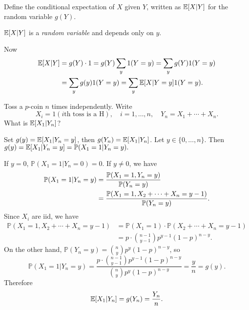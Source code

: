 \begin{definition}
    Define the conditional expectation of $X$ given $Y$, written as $ {\mathbb{E}}[X|Y] $ for the random variable $g(Y)$.
\end{definition}
\begin{remark}
    $ {\mathbb{E}}[X|Y] $ is a \textit{random variable} and depends only on $y$.
\end{remark}
Now 
\begin{align*}
    {\mathbb{E}}[X|Y] &= g(Y)\cdot 1 = g(Y) \sum_{y} 1(Y=y) = \sum_{y} g(Y)1(Y=y)\\ 
    &= \sum_{y} g(y)1(Y=y)=\sum_{y} {\mathbb{E}}[X|Y=y]1(Y=y).
\end{align*}
\begin{example}\label{eg:2.11}
    Toss a $p$-coin $n$ times independently. Write 
    \[
        X_i = 1(i\text{th toss is a H}),\quad i=1,\dots,n,\quad Y_n=X_1+\cdots+X_n.
    \]
    What is $ {\mathbb{E}}[X_1|Y_n] $?

    Set $ g(y)={\mathbb{E}}[X_1|Y_n=y] $, then $g(Y_n)={\mathbb{E}}[X_1|Y_n]$. Let $ y\in \{0,\dots,n\} $. Then $g(y) = {\mathbb{E}}[X_1|Y_n=y] = \mathbb{P}(X_1=1|Y_n=y).$ 

    If $ y=0 $, $\mathbb{P}(X_1=1|Y_n=0)=0$. If $ y\neq 0 $, we have 
    \begin{align*}
        \mathbb{P}(X_1=1|Y_n=y) &= \frac{{\mathbb{P}}(X_1=1,Y_n=y)}{{\mathbb{P}}(Y_n=y)}\\ 
        &= \frac{{\mathbb{P}}(X_1=1,X_2+\cdots+X_n=y-1)}{{\mathbb{P}}(Y_n=y)}.
    \end{align*}
    Since $X_i$ are iid, we have 
    \begin{align*}
        \mathbb{P}(X_1=1,X_2+\cdots+X_n=y-1)&= \mathbb{P}(X_1=1)\cdot \mathbb{P}(X_2+\cdots+X_n=y-1)\\ 
        &= p \cdot \binom{n-1}{y-1}p^{y-1}(1-p)^{n-y}.
    \end{align*}
    On the other hand, $ \mathbb{P}(Y_n=y) = \binom{n}{y}p^{y}(1-p)^{n-y} $, so 
    \[
        \mathbb{P}(X_1=1|Y_n=y) = \frac{p \cdot \binom{n-1}{y-1}p^{y-1}(1-p)^{n-y}}{\binom{n}{y}p^{y}(1-p)^{n-y}} = \frac{y}{n} = g(y).
    \]
    Therefore 
    \[
        {\mathbb{E}}[X_1|Y_n] = g(Y_n) = \frac{Y_n}{n}.
    \]
\end{example}
